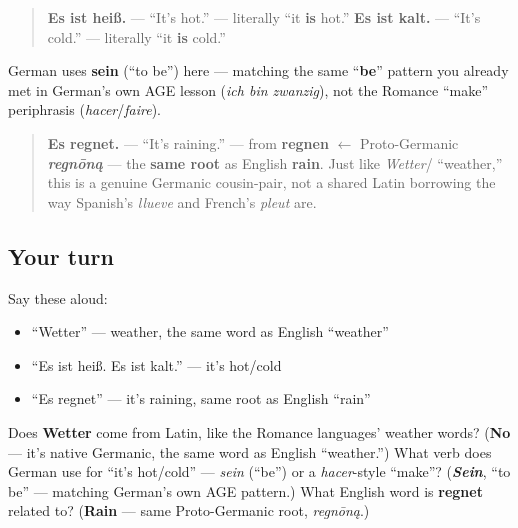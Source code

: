 \begin{grammarlens}[title={Grammar Lens: Es ist heiß / Es ist kalt}]
\begin{quote}
\textbf{Es ist heiß.} — \textquotedblleft{}It's hot.\textquotedblright{} — literally \textquotedblleft{}it \textbf{is} hot.\textquotedblright{} \textbf{Es ist kalt.} — \textquotedblleft{}It's cold.\textquotedblright{} — literally \textquotedblleft{}it \textbf{is} cold.\textquotedblright{}
\end{quote}

German uses \textbf{sein} (\textquotedblleft{}to be\textquotedblright{}) here — matching the same \textquotedblleft{}\textbf{be}\textquotedblright{} pattern you already met in German's own AGE lesson (\emph{ich bin zwanzig}), not the Romance \textquotedblleft{}make\textquotedblright{} periphrasis (\emph{hacer}/\emph{faire}).
\end{grammarlens}

\begin{cousinweb}
\begin{quote}
\textbf{Es regnet.} — \textquotedblleft{}It's raining.\textquotedblright{} — from \textbf{regnen} $\leftarrow$ Proto-Germanic \emph{\textbf{regnōną}} — the \textbf{same root} as English \textbf{rain}. Just like \emph{Wetter}/ \textquotedblleft{}weather,\textquotedblright{} this is a genuine Germanic cousin-pair, not a shared Latin borrowing the way Spanish's \emph{llueve} and French's \emph{pleut} are.
\end{quote}
\end{cousinweb}

\subsection*{Your turn}
Say these aloud:

\begin{itemize}
\raggedright
  \item \textquotedblleft{}Wetter\textquotedblright{} — weather, the same word as English \textquotedblleft{}weather\textquotedblright{}
  \item \textquotedblleft{}Es ist heiß. Es ist kalt.\textquotedblright{} — it's hot/cold
  \item \textquotedblleft{}Es regnet\textquotedblright{} — it's raining, same root as English \textquotedblleft{}rain\textquotedblright{}
\end{itemize}

\begin{tcolorbox}[breakable,colback=teal!4,colframe=teal!35!black,title={Before you move on}]
Does \textbf{Wetter} come from Latin, like the Romance languages' weather words? (\textbf{No} — it's native Germanic, the same word as English \textquotedblleft{}weather.\textquotedblright{}) What verb does German use for \textquotedblleft{}it's hot/cold\textquotedblright{} — \emph{sein} (\textquotedblleft{}be\textquotedblright{}) or a \emph{hacer}-style \textquotedblleft{}make\textquotedblright{}? (\emph{\textbf{Sein}}, \textquotedblleft{}to be\textquotedblright{} — matching German's own AGE pattern.) What English word is \textbf{regnet} related to? (\textbf{Rain} — same Proto-Germanic root, \emph{regnōną}.)
\end{tcolorbox}
